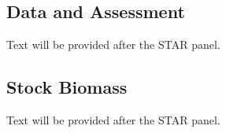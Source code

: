 \documentclass[
  english,
  a4paper,
]{article}
\begin{document}
\hypertarget{data-and-assessment}{%
\subsection*{Data and Assessment}\label{data-and-assessment}}

Text will be provided after the STAR panel.

\hypertarget{stock-biomass}{%
\subsection*{Stock Biomass}\label{stock-biomass}}

Text will be provided after the STAR panel.

\begin{table}[H]


\end{table}
\end{document}
